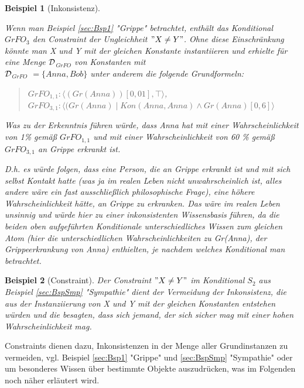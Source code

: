 \documentclass[a4paper, 11pt]{book}
\newtheorem{Bsp}{Beispiel}[section]
\begin{document}
\begin{Bsp}[Inkonsistenz]
\label{sec:Bsp}

Wenn man Beispiel \ref{sec:Bsp1} "{}Grippe"{} betrachtet, enthält das Konditional $ GrFO_{3}$ den Constraint der Ungleichheit $ "{} X \neq Y "{} $. Ohne diese Einschränkung könnte man X und Y mit der gleichen Konstante instantiieren und erhielte  für eine Menge $ \cal D $$_{GrFO} $ von Konstanten mit\\
 $ \cal D $$_{GrFO}  $ $ = \{Anna, Bob \} $ unter anderem die folgende Grundformeln:\\
 \begin{quote}
 	$ GrFO_{1, 1}  :  \langle (Gr(Anna))[0,01], \top \rangle $,\\
 	$ GrFO_{3, 1} : \langle (Gr(Anna) \mid Kon(Anna, Anna) \wedge Gr(Anna)[0,6]  \rangle$\\
 \end{quote}
  Was zu der Erkenntnis führen würde, dass Anna hat mit einer Wahrscheinlichkeit von 1\% gemäß  $ GrFO_{1, 1}  $ und mit einer Wahrscheinlichkeit von 60 \% gemäß $ GrFO_{3, 1}  $ an Grippe erkrankt ist. 
  
 D.h. es würde folgen, dass eine Person, die an Grippe erkrankt ist und mit sich selbst Kontakt hatte (was ja im realen Leben nicht unwahrscheinlich ist, alles andere wäre ein fast ausschließlich philosophische Frage), eine höhere Wahrscheinlichkeit hätte, an Grippe zu erkranken. Das wäre im realen Leben unsinnig und würde hier zu einer inkonsistenten Wissensbasis führen, da die beiden oben aufgeführten Konditionale unterschiedliches Wissen zum gleichen Atom (hier die unterschiedlichen Wahrscheinlichkeiten zu Gr(Anna), der Grippeerkrankung von Anna) enthielten, je nachdem welches Konditional man betrachtet. 



\end{Bsp}

\begin{Bsp}[Constraint]
\label{sec:BspConstraint}
Der Constraint $ "{} X \neq Y "{} $ im Konditional $ S_{2} $ aus Beispiel \ref{sec:BspSmp} "{}Sympathie"{} dient der Vermeidung der Inkonsistenz, die aus der Instanziierung von X und Y mit der gleichen Konstanten entstehen würden und die besagten, dass sich jemand, der sich sicher mag mit einer hohen Wahrscheinlichkeit mag. 
\end{Bsp}
Constraints dienen dazu, Inkonsistenzen in der Menge aller Grundinstanzen zu vermeiden, vgl. Beispiel \ref{sec:Bsp1} "{}Grippe"{}  und \ref{sec:BspSmp} "{}Sympathie"{} oder um besonderes Wissen über bestimmte Objekte auszudrücken, was im Folgenden noch näher erläutert wird.
\end{document}
